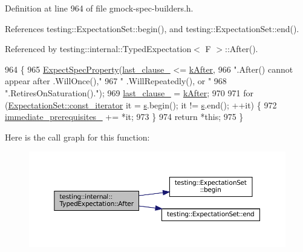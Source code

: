 Definition at line 964 of file gmock-\/spec-\/builders.\+h.



References testing\+::\+Expectation\+Set\+::begin(), and testing\+::\+Expectation\+Set\+::end().



Referenced by testing\+::internal\+::\+Typed\+Expectation$<$ F $>$\+::\+After().


\begin{DoxyCode}
964                                                    \{
965     \hyperlink{classtesting_1_1internal_1_1ExpectationBase_a652adbe3fcca2950175e3859d59af268}{ExpectSpecProperty}(\hyperlink{classtesting_1_1internal_1_1ExpectationBase_a584f296e53b4cc002ddf5e65e44d72d9}{last\_clause\_} <= \hyperlink{classtesting_1_1internal_1_1ExpectationBase_a450f34b979ec5814c91d4eab6b78cfc2a7988a8564321947266de0e74148ae4ec}{kAfter},
966                        \textcolor{stringliteral}{".After() cannot appear after .WillOnce(),"}
967                        \textcolor{stringliteral}{" .WillRepeatedly(), or "}
968                        \textcolor{stringliteral}{".RetiresOnSaturation()."});
969     \hyperlink{classtesting_1_1internal_1_1ExpectationBase_a584f296e53b4cc002ddf5e65e44d72d9}{last\_clause\_} = \hyperlink{classtesting_1_1internal_1_1ExpectationBase_a450f34b979ec5814c91d4eab6b78cfc2a7988a8564321947266de0e74148ae4ec}{kAfter};
970 
971     \textcolor{keywordflow}{for} (\hyperlink{classtesting_1_1ExpectationSet_ab269a45f80d8c4f747b29de454a084bb}{ExpectationSet::const\_iterator} it = \hyperlink{namespaceservice__node__3_aa976421a49e0b54f23833423400849ae}{s}.begin(); it != 
      \hyperlink{namespaceservice__node__3_aa976421a49e0b54f23833423400849ae}{s}.end(); ++it) \{
972       \hyperlink{classtesting_1_1internal_1_1ExpectationBase_a186eff0fdcacc8c1e1a2becdec11d3cd}{immediate\_prerequisites\_} += *it;
973     \}
974     \textcolor{keywordflow}{return} *\textcolor{keyword}{this};
975   \}
\end{DoxyCode}
Here is the call graph for this function\+:
\nopagebreak
\begin{figure}[H]
\begin{center}
\leavevmode
\includegraphics[width=350pt]{classtesting_1_1internal_1_1TypedExpectation_a30f320d18ebf1a40e94883d7a56c6c8c_cgraph}
\end{center}
\end{figure}
